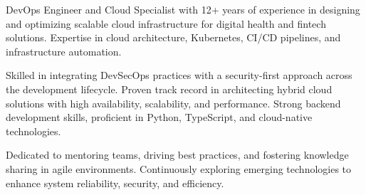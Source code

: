 
\begin{cvparagraph}

DevOps Engineer and Cloud Specialist with 12+ years of experience in designing and optimizing scalable cloud infrastructure for digital health and fintech solutions. Expertise in cloud architecture, Kubernetes, CI/CD pipelines, and infrastructure automation.

Skilled in integrating DevSecOps practices with a security-first approach across the development lifecycle. Proven track record in architecting hybrid cloud solutions with high availability, scalability, and performance. Strong backend development skills, proficient in Python, TypeScript, and cloud-native technologies.

Dedicated to mentoring teams, driving best practices, and fostering knowledge sharing in agile environments. Continuously exploring emerging technologies to enhance system reliability, security, and efficiency.

\end{cvparagraph}
